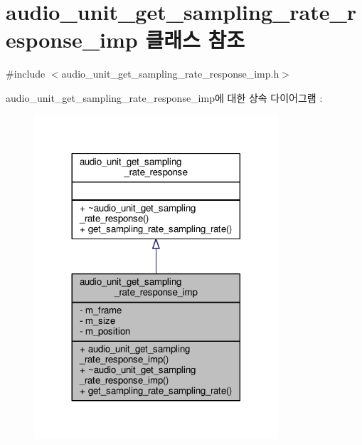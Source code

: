 \hypertarget{classavdecc__lib_1_1audio__unit__get__sampling__rate__response__imp}{}\section{audio\+\_\+unit\+\_\+get\+\_\+sampling\+\_\+rate\+\_\+response\+\_\+imp 클래스 참조}
\label{classavdecc__lib_1_1audio__unit__get__sampling__rate__response__imp}


{\ttfamily \#include $<$audio\+\_\+unit\+\_\+get\+\_\+sampling\+\_\+rate\+\_\+response\+\_\+imp.\+h$>$}



audio\+\_\+unit\+\_\+get\+\_\+sampling\+\_\+rate\+\_\+response\+\_\+imp에 대한 상속 다이어그램 \+: 
\nopagebreak
\begin{figure}[H]
\begin{center}
\leavevmode
\includegraphics[width=257pt]{classavdecc__lib_1_1audio__unit__get__sampling__rate__response__imp__inherit__graph}
\end{center}
\end{figure}


